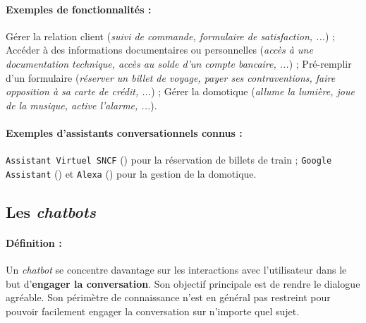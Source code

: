 			\paragraph{Exemples de fonctionnalités :}
				
				Gérer la relation client (\textit{suivi de commande, formulaire de satisfaction, ...}) ;
				Accéder à des informations documentaires ou personnelles (\textit{accès à une documentation technique, accès au solde d'un compte bancaire, ...}) ;
				Pré-remplir d'un formulaire (\textit{réserver un billet de voyage, payer ses contraventions, faire opposition à sa carte de crédit, ...}) ;
				 Gérer la domotique (\textit{allume la lumière, joue de la musique, active l'alarme, ...}).
			
			\paragraph{Exemples d'assistants conversationnels connus :}
				
				\texttt{Assistant Virtuel SNCF} (\cite{sncf:2018:agent-virtuel-sncf}) pour la réservation de billets de train ;
				\texttt{Google Assistant} (\cite{google:2016:google-assistant-your}) et \texttt{Alexa} (\cite{alexa-internet:2018:keyword-research-competitor}) pour la gestion de la domotique.
		
		
		\subsection{Les \textit{chatbots} }
		\label{annex:B.1.2-CHATBOT-CLASSIFICATION-CHAT-ORIENTED}
		
			\paragraph{Définition :}
				
				Un \textit{chatbot}  se concentre davantage sur les interactions avec l'utilisateur dans le but d'\textbf{engager la conversation}.
				Son objectif principale est de rendre le dialogue agréable.
				Son périmètre de connaissance n'est en général pas restreint pour pouvoir facilement engager la conversation sur n'importe quel sujet.
		
